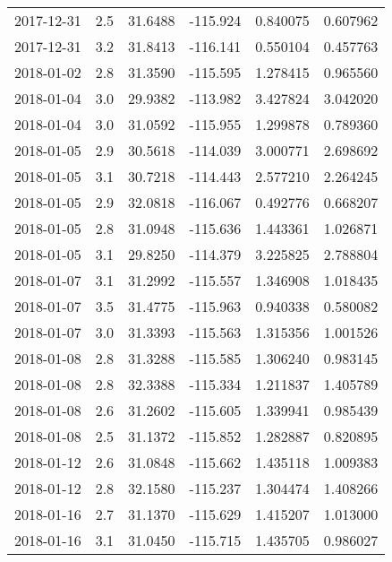 \begin{tabular}{lrrrrr}
2017-12-31 &       2.5 &  31.6488 &  -115.924 &         0.840075 &         0.607962 \\
2017-12-31 &       3.2 &  31.8413 &  -116.141 &         0.550104 &         0.457763 \\
2018-01-02 &       2.8 &  31.3590 &  -115.595 &         1.278415 &         0.965560 \\
2018-01-04 &       3.0 &  29.9382 &  -113.982 &         3.427824 &         3.042020 \\
2018-01-04 &       3.0 &  31.0592 &  -115.955 &         1.299878 &         0.789360 \\
2018-01-05 &       2.9 &  30.5618 &  -114.039 &         3.000771 &         2.698692 \\
2018-01-05 &       3.1 &  30.7218 &  -114.443 &         2.577210 &         2.264245 \\
2018-01-05 &       2.9 &  32.0818 &  -116.067 &         0.492776 &         0.668207 \\
2018-01-05 &       2.8 &  31.0948 &  -115.636 &         1.443361 &         1.026871 \\
2018-01-05 &       3.1 &  29.8250 &  -114.379 &         3.225825 &         2.788804 \\
2018-01-07 &       3.1 &  31.2992 &  -115.557 &         1.346908 &         1.018435 \\
2018-01-07 &       3.5 &  31.4775 &  -115.963 &         0.940338 &         0.580082 \\
2018-01-07 &       3.0 &  31.3393 &  -115.563 &         1.315356 &         1.001526 \\
2018-01-08 &       2.8 &  31.3288 &  -115.585 &         1.306240 &         0.983145 \\
2018-01-08 &       2.8 &  32.3388 &  -115.334 &         1.211837 &         1.405789 \\
2018-01-08 &       2.6 &  31.2602 &  -115.605 &         1.339941 &         0.985439 \\
2018-01-08 &       2.5 &  31.1372 &  -115.852 &         1.282887 &         0.820895 \\
2018-01-12 &       2.6 &  31.0848 &  -115.662 &         1.435118 &         1.009383 \\
2018-01-12 &       2.8 &  32.1580 &  -115.237 &         1.304474 &         1.408266 \\
2018-01-16 &       2.7 &  31.1370 &  -115.629 &         1.415207 &         1.013000 \\
2018-01-16 &       3.1 &  31.0450 &  -115.715 &         1.435705 &         0.986027 \\

\end{tabular}
